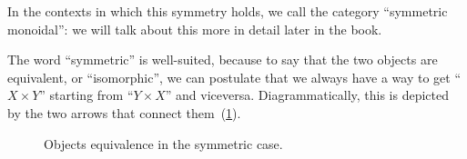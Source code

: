 In the contexts in which this symmetry holds, we call the category ``symmetric monoidal'': we will talk about this more in detail later in the book.

The word ``symmetric'' is well-suited, because to say that the two objects are equivalent, or ``isomorphic'', we can postulate that we always have a way to get
``$X \times Y$'' starting from ``$Y \times X$'' and viceversa.
Diagrammatically, this is depicted by the two arrows that connect them~(\cref{fig:e17}).

\begin{figure}[h!]
    \centering
    \caption{Objects equivalence in the symmetric case. }
    \label{fig:e17}
\end{figure}

